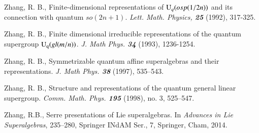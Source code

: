 \documentclass[12pt]{amsart}
\theoremstyle{definition}
\theoremstyle{remark}
\numberwithin{equation}{section}
\begin{document}
\begin{thebibliography}{9999}
 Zhang, R. B., Finite-dimensional representations of ${{\rm U}}_q (osp (1/2n))$ and its connection with quantum $so (2n+ 1)$. {\sl Lett. Math. Physics, \bf 25}  (1992),  317-325.

 Zhang, R. B.,
Finite dimensional irreducible representations of the quantum supergroup ${{\rm{U}_q}} (gl (m/n))$.
{\sl J. Math Phys. \bf 34} (1993), 1236-1254.

 Zhang, R. B., Symmetrizable quantum affine superalgebras and their representations.  {\sl J. Math Phys. \bf 38} (1997),  535--543.

 Zhang, R. B., Structure and representations of the quantum general linear supergroup. {\sl Comm. Math. Phys. \bf 195} (1998), no. 3, 525--547.

 Zhang, R.B., Serre presentations of Lie superalgebras. In {\em Advances in Lie Superalgebras}, 235--280, Springer INdAM Ser., 7, Springer, Cham, 2014.

\end{thebibliography}
\end{document}
